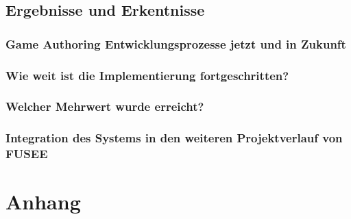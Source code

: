 \documentclass[pagesize, paper=a4, fontsize=12pt,titlepage=true, headings=small, headnosepline, abstractoff, liststotoc, nochapterprefix, plainheadsepline, twoside]{scrreprt}
\begin{document}


\chapter{Ergebnisse und Erkentnisse}
\section{Game Authoring Entwicklungsprozesse jetzt und in Zukunft}
\section{Wie weit ist die Implementierung fortgeschritten?}
\section{Welcher Mehrwert wurde erreicht?}
\section{Integration des Systems in den weiteren Projektverlauf von FUSEE}


\part*{Anhang}


\lstlistoflistings

\listoftables

\listoffigures
\end{document}
